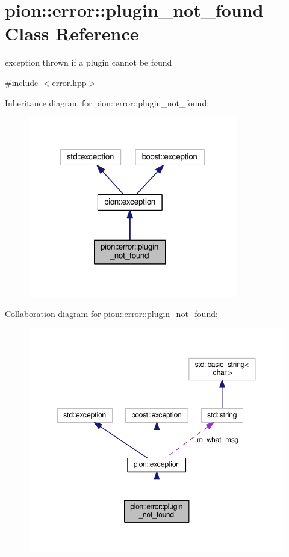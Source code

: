 \hypertarget{classpion_1_1error_1_1plugin__not__found}{\section{pion\-:\-:error\-:\-:plugin\-\_\-not\-\_\-found Class Reference}
\label{classpion_1_1error_1_1plugin__not__found}
}


exception thrown if a plugin cannot be found  




{\ttfamily \#include $<$error.\-hpp$>$}



Inheritance diagram for pion\-:\-:error\-:\-:plugin\-\_\-not\-\_\-found\-:
\nopagebreak
\begin{figure}[H]
\begin{center}
\leavevmode
\includegraphics[width=259pt]{classpion_1_1error_1_1plugin__not__found__inherit__graph}
\end{center}
\end{figure}


Collaboration diagram for pion\-:\-:error\-:\-:plugin\-\_\-not\-\_\-found\-:
\nopagebreak
\begin{figure}[H]
\begin{center}
\leavevmode
\includegraphics[width=350pt]{classpion_1_1error_1_1plugin__not__found__coll__graph}
\end{center}
\end{figure}
